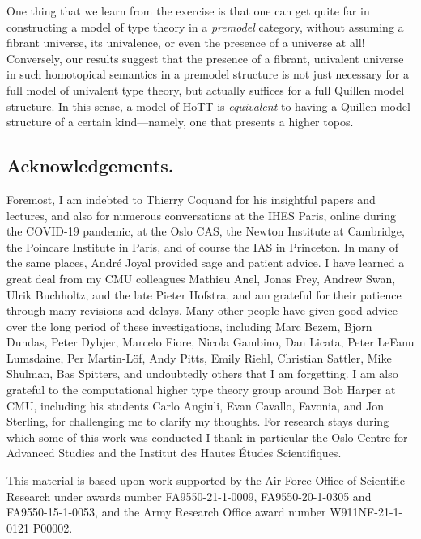 \documentclass[11pt]{amsart}
\theoremstyle{remark}
\theoremstyle{definition}
\begin{document}
One thing that we learn from the exercise is that one can get quite far in constructing a model of type theory in a \emph{premodel} category,   without assuming a fibrant universe, its univalence, or even the presence of a universe at all!  Conversely, our results suggest that the presence of a fibrant, univalent universe in such homotopical semantics in a premodel structure is not just necessary for a full model of univalent type theory, but actually suffices for a full Quillen model structure. In this sense, a model of HoTT is \emph{equivalent} to having a Quillen model structure of a certain kind---namely, one that presents a higher topos.


\subsection*{Acknowledgements.}

Foremost, I am indebted to Thierry Coquand for his insightful papers and lectures, and also for numerous conversations at the IHES Paris, online during the COVID-19 pandemic, at the Oslo CAS, the Newton Institute at Cambridge, the Poincare Institute in Paris, and of course the IAS in Princeton.  In many of the same places, Andr\'e Joyal provided sage and patient advice.   
I have learned a great deal from my CMU colleagues Mathieu Anel, Jonas Frey, Andrew Swan, Ulrik Buchholtz, and the late Pieter Hofstra, and am grateful for their patience through many revisions and delays.  Many other people have given good advice over the long period of these investigations, including Marc Bezem, Bjorn Dundas, Peter Dybjer, Marcelo Fiore, Nicola Gambino, Dan Licata, Peter LeFanu Lumsdaine, Per Martin-L\"of, Andy Pitts, Emily Riehl, Christian Sattler, Mike Shulman, Bas Spitters, and undoubtedly others that I am forgetting.
I am also grateful to the computational higher type theory group around Bob Harper at CMU, including his students Carlo Angiuli, Evan Cavallo, Favonia, and Jon Sterling, for challenging me to clarify my thoughts.  
For research stays during which some of this work was conducted I thank in particular the Oslo Centre for Advanced Studies and the Institut des Hautes \'Etudes Scientifiques.

This material is based upon work supported by the Air Force Office of Scientific Research under awards number FA9550-21-1-0009, FA9550-20-1-0305 and FA9550-15-1-0053, and the Army Research Office award number W911NF-21-1-0121 P00002.
\end{document}
